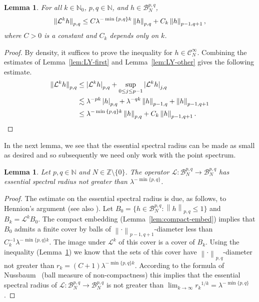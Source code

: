 \documentclass[a4paper,11pt]{amsart}
\newtheorem{lemma}[theorem]{Lemma}
\theoremstyle{remark}
\newcommand{\cB}{\mathcal{B}} %
\newcommand{\cC}{\mathcal{C}} %
\newcommand{\cL}{\mathcal{L}} %
\newcommand{\bN}{\mathbb{N}} %
\newcommand{\bZ}{\mathbb{Z}} %
\newcommand{\norm}[1]{\left\|#1\right\|} %
\newcommand{\snorm}[1]{\left|#1\right|} %
\begin{document}
\begin{lemma}
    \label{lem:lasota-yorke}
    For all \(k \in \bN_0\), \(p,q \in \bN\), and \(h\in \cB_{N}^{p,q}\),
    \[
        \norm{\smash{\mathcal{L}^k h}}_{p,q} \leq C\lambda ^{-\min{\{p,q\}} k} \norm{h}_{p,q} +  C_k\norm{h}_{p-1,q+1},
    \]
    where \(C>0\) is a constant and \(C_k\) depends only on \(k\).
\end{lemma}

\begin{proof}
    By density, it suffices to prove the inequality for \(h\in  \cC^{\infty}_{N}\).
    Combining the estimates of Lemma~\ref{lem:LY-first} and Lemma~\ref{lem:LY-other} gives the following estimate.
    \begin{align*}
        \norm{\smash{\mathcal{L}^k h}}_{p,q}
         & \leq \snorm{\smash{\cL^k h}}_{p,q} +  \sup_{0\leq j \leq p-1}  \snorm{\smash{\cL^k h}}_{j,q} \\
         & \lesssim  \lambda^{-pk} \snorm{h}_{p,q}
        +  \lambda^{-qk} \norm{h}_{p-1,q} +
        \norm{h}_{p-1,q+1}                                                                              \\
         & \leq  \lambda^{-\min{\{p,q\}} k} \norm{h}_{p,q}
        + C_k  \norm{h}_{p-1,q+1}. \qedhere
    \end{align*}
\end{proof}

In the next lemma, we see that the essential spectral radius can be made as small as desired and so subsequently we need only work with the point spectrum. 

\begin{lemma}
    \label{lem:spectrum}
    Let \(p,q \in \bN\) and \(N\in \bZ \setminus \{0\}\).
    The operator \(\cL  : \cB_{N}^{p,q} \to \cB_{N}^{p,q}\) has essential spectral radius not greater than \(\lambda^{-\min{\{p,q\}}}\).
\end{lemma}

\begin{proof}
    The estimate on the essential spectral radius is due, as follows, to Hennion's argument \cite{Hennion93} (see also \cite{DKL21}).
    Let \(B_0 = \{h \in \cB_{N}^{p,q} : \norm{h}_{p,q} \leq 1\}\) and \(B_k = \cL^k B_0\).
    The compact embedding (Lemma~\ref{lem:compact-embed}) implies that \(B_0\) admits a finite cover by balls of \(\norm{\cdot}_{p-1,q+1}\)-diameter less than \(C_k^{-1} \lambda^{-\min{\{p,q\}}k}\). 
    The image under \(\cL^k\) of this cover is a cover of \(B_k\).
    Using the inequality (Lemma~\ref{lem:lasota-yorke}) we know that the sets of this cover have \(\norm{\cdot}_{p,q}\)-diameter not greater than \(r_k = (C+1)\lambda^{-\min{\{p,q\}}k}\).
    According to the formula of Nussbaum~\cite{Nussbaum70} (ball measure of non-compactness) this implies that the essential spectral radius of \(\cL  : \cB_{N}^{p,q} \to \cB_{N}^{p,q}\) is not greater than \(\lim_{k\to\infty} {r_k}^{1/k} = \lambda^{-\min{\{p,q\}}}\).
\end{proof}
\end{document}
